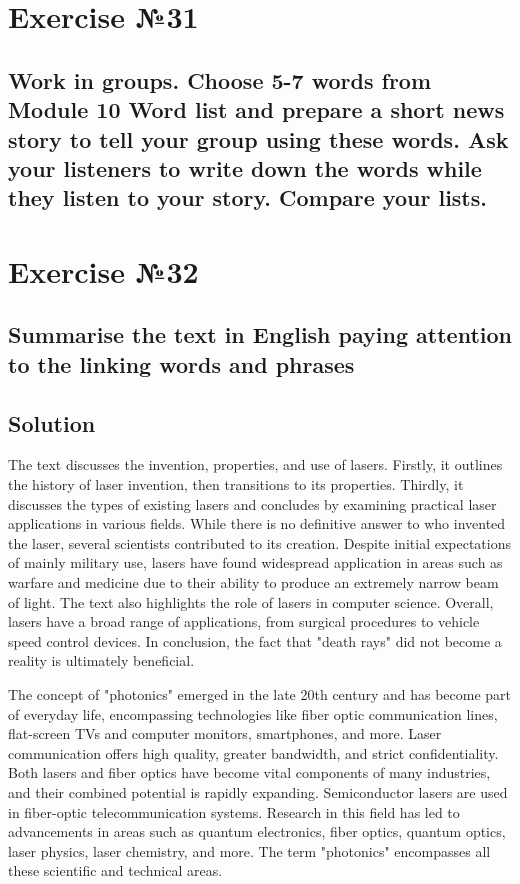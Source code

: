 \section*{Exercise №31}
\subsection*{Work in groups. Choose 5-7 words from Module 10 Word list and prepare a
      short news story to tell your group using these words. Ask your listeners to write
      down the words while they listen to your story. Compare your lists.}

\section*{Exercise №32}
\subsection*{Summarise the text in English paying attention to the linking words and
      phrases}

\subsection*{Solution}
The text discusses the invention, properties, and use of lasers. Firstly, it outlines
the history of laser invention, then transitions to its properties. Thirdly, it
discusses the types of existing lasers and concludes by examining practical laser
applications in various fields. While there is no definitive answer to who invented
the laser, several scientists contributed to its creation. Despite initial expectations
of mainly military use, lasers have found widespread application in areas such as
warfare and medicine due to their ability to produce an extremely narrow beam of
light. The text also highlights the role of lasers in computer science. Overall,
lasers have a broad range of applications, from surgical procedures to vehicle speed
control devices. In conclusion, the fact that "death rays" did not become a reality
is ultimately beneficial.

The concept of "photonics" emerged in the late 20th century and has become part of
everyday life, encompassing technologies like fiber optic communication lines,
flat-screen TVs and computer monitors, smartphones, and more. Laser communication
offers high quality, greater bandwidth, and strict confidentiality. Both lasers and
fiber optics have become vital components of many industries, and their combined
potential is rapidly expanding. Semiconductor lasers are used in fiber-optic
telecommunication systems. Research in this field has led to advancements in areas
such as quantum electronics, fiber optics, quantum optics, laser physics, laser
chemistry, and more. The term "photonics" encompasses all these scientific and
technical areas.

